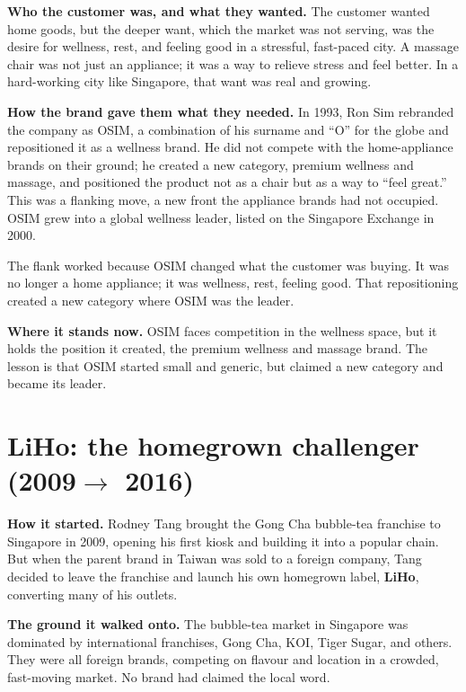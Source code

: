 \documentclass[10pt,twoside,openany]{memoir}
\newcommand{\needspacehead}{\needspace{4\baselineskip}}
\let\oldsection\section
\renewcommand{\section}{\needspacehead\oldsection}
\begin{document}
\textbf{Who the customer was, and what they wanted.} The customer wanted
home goods, but the deeper want, which the market was not serving, was
the desire for wellness, rest, and feeling good in a stressful,
fast-paced city. A massage chair was not just an appliance; it was a way
to relieve stress and feel better. In a hard-working city like
Singapore, that want was real and growing.

\textbf{How the brand gave them what they needed.} In 1993, Ron Sim
rebranded the company as OSIM, a combination of his surname and ``O''
for the globe and repositioned it as a wellness brand. He did not
compete with the home-appliance brands on their ground; he created a new
category, premium wellness and massage, and positioned the product not
as a chair but as a way to ``feel great.'' This was a flanking move, a
new front the appliance brands had not occupied. OSIM grew into a global
wellness leader, listed on the Singapore Exchange in 2000.

The flank worked because OSIM changed what the customer was buying. It
was no longer a home appliance; it was wellness, rest, feeling good.
That repositioning created a new category where OSIM was the leader.

\textbf{Where it stands now.} OSIM faces competition in the wellness
space, but it holds the position it created, the premium wellness and
massage brand. The lesson is that OSIM started small and generic, but
claimed a new category and became its leader.

\section{\texorpdfstring{LiHo: the homegrown challenger
(2009\(\rightarrow\)
2016)}{LiHo: the homegrown challenger (2009\textbackslash rightarrow 2016)}}\label{liho-the-homegrown-challenger-2009rightarrow-2016}

\textbf{How it started.} Rodney Tang brought the Gong Cha bubble-tea
franchise to Singapore in 2009, opening his first kiosk and building it
into a popular chain. But when the parent brand in Taiwan was sold to a
foreign company, Tang decided to leave the franchise and launch his own
homegrown label, \textbf{LiHo}, converting many of his outlets.

\textbf{The ground it walked onto.} The bubble-tea market in Singapore
was dominated by international franchises, Gong Cha, KOI, Tiger Sugar,
and others. They were all foreign brands, competing on flavour and
location in a crowded, fast-moving market. No brand had claimed the
local word.
\end{document}
